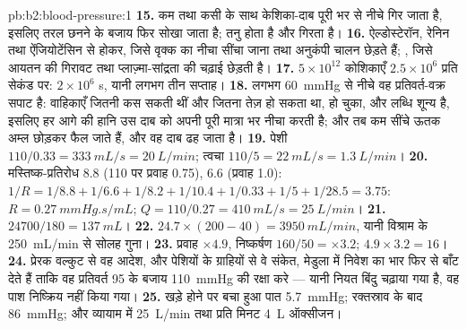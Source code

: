 \begin{solution}{pb:b2:blood-pressure:1}
\textbf{15.} कम  तथा कसी  के साथ
केशिका-दाब पूरी  भर  से नीचे गिर जाता है,
इसलिए तरल छनने के बजाय फिर सोखा जाता है;  तनु होता है और
 गिरता है।
\textbf{16.} ऐल्डोस्टेरॉन, रेनिन तथा ऐंजियोटेंसिन से होकर, जिसे वृक्क का
नीचा सींचा जाना तथा अनुकंपी चालन छेड़ते हैं; ,
जिसे आयतन की गिरावट तथा प्लाज़्मा-सांद्रता की चढ़ाई
छेड़ती है।
\textbf{17.} $5\times 10^{12}$ कोशिकाएँ $2.5\times 10^{6}$ प्रति सेकंड पर:
$2\times 10^{6}$ s, यानी लगभग तीन सप्ताह।
\textbf{18.} लगभग \qty{60}{mmHg} से नीचे वह प्रतिवर्त-वक्र सपाट है:
वाहिकाएँ जितनी कस सकती थीं और  जितना तेज़ हो सकता था, हो चुका, और लब्धि
शून्य है, इसलिए हर आगे की हानि उस दाब को अपनी पूरी मात्रा भर
नीचा करती है; और तब कम सींचे ऊतक अम्ल छोड़कर फैल जाते हैं, और
वह दाब ढह जाता है।
\textbf{19.} पेशी $110/0.33 = \qty{333}{mL/s} = \qty{20}{L/min}$;
त्वचा $110/5 = \qty{22}{mL/s} = \qty{1.3}{L/min}$।
\textbf{20.} मस्तिष्क-प्रतिरोध $8.8$ (110 पर प्रवाह 0.75),  $6.6$
(प्रवाह 1.0): $1/R = 1/8.8 + 1/6.6 + 1/8.2 + 1/10.4 + 1/0.33 + 1/5 +
1/28.5 = 3.75$: $R = \qty{0.27}{mmHg.s/mL}$; $Q = 110/0.27 =
\qty{410}{mL/s} = \qty{25}{L/min}$।
\textbf{21.} $\num{24700}/180 = \qty{137}{mL}$।
\textbf{22.} $24.7\times(200 - 40) = \qty{3950}{mL/min}$, यानी
विश्राम के \qty{250}{mL/min} से सोलह गुना।
\textbf{23.} प्रवाह $\times 4.9$, निष्कर्षण $160/50 = \times 3.2$;
$4.9\times 3.2 = 16$।
\textbf{24.} प्रेरक वल्कुट से वह आदेश, और पेशियों के ग्राहियों से
वे संकेत, मेडुला में  निवेश का भार फिर से बाँट देते
हैं ताकि वह प्रतिवर्त 95 के बजाय \qty{110}{mmHg} की रक्षा करे ---
यानी नियत बिंदु चढ़ाया गया है, वह पाश निष्क्रिय नहीं किया गया।
\textbf{25.} खड़े होने पर बचा हुआ पात \qty{5.7}{mmHg}; रक्तस्राव के बाद
\qty{86}{mmHg}; और व्यायाम में \qty{25}{L/min} तथा प्रति मिनट
\qty{4}{L} ऑक्सीजन।
\end{solution}
